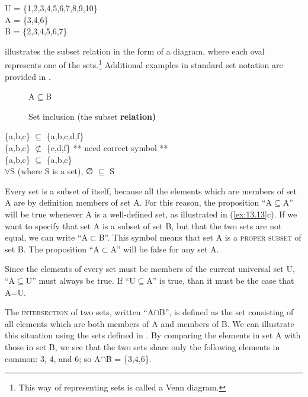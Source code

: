 \ea \label{ex:13.12}
U = \{1,2,3,4,5,6,7,8,9,10\}\\
A = \{3,4,6\}\\
B = \{2,3,4,5,6,7\}
\z


 illustrates the subset relation in the form of a diagram, where each oval represents one of the sets.\footnote{This way of representing sets is called a Venn diagram.} Additional examples in standard set notation are provided in .


\begin{figure}

  \textsf{A}\textbf{${\subseteq}$}\textsf{B}\\

\caption{\label{fig:key:1} Set inclusion (the subset \textbf{relation)}}
\end{figure}

\ea \label{ex:13.13}
\ea  \{a,b,c\} ${\subseteq}$ \{a,b,c,d,f\}\\
\ex \{a,b,c\} ${\not\subset}$ \{c,d,f\}  ** need correct symbol **\\
\ex \{a,b,c\} ${\subseteq}$ \{a,b,c\}\\
\ex ${\forall}$S (where S is a set), ∅ ${\subseteq}$ S
                       \z
\z


Every set is a subset of itself, because all the elements which are members of set A are by definition members of set A. For this reason, the proposition “A${\subseteq}$A” will be true whenever A is a well-defined set, as illustrated in (\ref{ex:13.13}c). If we want to specify that set A is a subset of set B, but that the two sets are not equal, we can write “A${\subset}$B”. This symbol means that set A is a \textsc{proper subset} of set B. The proposition “A${\subset}$A” will be false for any set A.



Since the elements of every set must be members of the current universal set U, “A${\subseteq}$U” must always be true. If “U${\subseteq}$A” is true, than it must be the case that A=U.



The \textsc{intersection} of two sets, written “A${\cap}$B”, is defined as the set consisting of all elements which are both members of A and members of B. We can illustrate this situation using the sets defined in . By comparing the elements in set A with those in set B, we see that the two sets share only the following elements in common: 3, 4, and 6; so A${\cap}$B = \{3,4,6\}.


